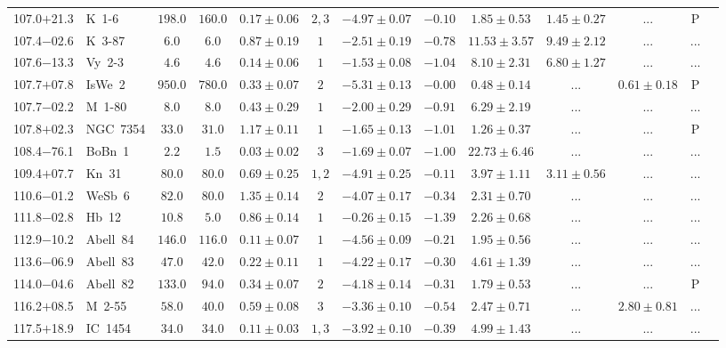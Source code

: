 \documentclass[useAMS]{mn2e}
\begin{document}
\begin{center}
{\begin{longtable}{llccccccccccc}
107.0$+$21.3&K~1-6&$     198.0$&$     160.0$&$0.17 \pm 0.06$&$2,3$&$-4.97 \pm 0.07$&$     -0.10$&$1.85 \pm 0.53$&$1.45 \pm 0.27$&$...$&P\\
107.4$-$02.6&K~3-87&$       6.0$&$       6.0$&$0.87 \pm 0.19$&$1$&$-2.51 \pm 0.19$&$     -0.78$&$11.53 \pm 3.57$&$9.49 \pm 2.12$&$...$&...\\
107.6$-$13.3&Vy~2-3&$       4.6$&$       4.6$&$0.14 \pm 0.06$&$1$&$-1.53 \pm 0.08$&$     -1.04$&$8.10 \pm 2.31$&$6.80 \pm 1.27$&$...$&...\\
107.7$+$07.8&IsWe~2&$     950.0$&$     780.0$&$0.33 \pm 0.07$&$2$&$-5.31 \pm 0.13$&$     -0.00$&$0.48 \pm 0.14$&$...$&$0.61 \pm 0.18$&P\\
107.7$-$02.2&M~1-80&$       8.0$&$       8.0$&$0.43 \pm 0.29$&$1$&$-2.00 \pm 0.29$&$     -0.91$&$6.29 \pm 2.19$&$...$&$...$&...\\
107.8$+$02.3&NGC~7354&$      33.0$&$      31.0$&$1.17 \pm 0.11$&$1$&$-1.65 \pm 0.13$&$     -1.01$&$1.26 \pm 0.37$&$...$&$...$&P\\
108.4$-$76.1&BoBn~1&$       2.2$&$       1.5$&$0.03 \pm 0.02$&$3$&$-1.69 \pm 0.07$&$     -1.00$&$22.73 \pm 6.46$&$...$&$...$&...\\
109.4$+$07.7&Kn~31&$      80.0$&$      80.0$&$0.69 \pm 0.25$&$1,2$&$-4.91 \pm 0.25$&$     -0.11$&$3.97 \pm 1.11$&$3.11 \pm 0.56$&$...$&...\\
110.6$-$01.2&WeSb~6&$      82.0$&$      80.0$&$1.35 \pm 0.14$&$2$&$-4.07 \pm 0.17$&$     -0.34$&$2.31 \pm 0.70$&$...$&$...$&...\\
111.8$-$02.8&Hb~12&$      10.8$&$       5.0$&$0.86 \pm 0.14$&$1$&$-0.26 \pm 0.15$&$     -1.39$&$2.26 \pm 0.68$&$...$&$...$&...\\
112.9$-$10.2&Abell~84&$     146.0$&$     116.0$&$0.11 \pm 0.07$&$1$&$-4.56 \pm 0.09$&$     -0.21$&$1.95 \pm 0.56$&$...$&$...$&...\\
113.6$-$06.9&Abell~83&$      47.0$&$      42.0$&$0.22 \pm 0.11$&$1$&$-4.22 \pm 0.17$&$     -0.30$&$4.61 \pm 1.39$&$...$&$...$&...\\
114.0$-$04.6&Abell~82&$     133.0$&$      94.0$&$0.34 \pm 0.07$&$2$&$-4.18 \pm 0.14$&$     -0.31$&$1.79 \pm 0.53$&$...$&$...$&P\\
116.2$+$08.5&M~2-55&$      58.0$&$      40.0$&$0.59 \pm 0.08$&$3$&$-3.36 \pm 0.10$&$     -0.54$&$2.47 \pm 0.71$&$...$&$2.80 \pm 0.81$&...\\
117.5$+$18.9&IC~1454&$      34.0$&$      34.0$&$0.11 \pm 0.03$&$1,3$&$-3.92 \pm 0.10$&$     -0.39$&$4.99 \pm 1.43$&$...$&$...$&...\\

\end{longtable}}
\end{center}
\end{document}
